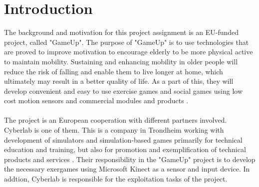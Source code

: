 \chapter{Introduction}
The background and motivation for this project assignment is an EU-funded project, called "GameUp". The purpose of "GameUp" is to use technologies that are proved to improve motivation to encourage elderly to be more physical active to maintain mobility. Sustaining and enhancing mobility in older people will reduce the risk of falling and enable them to live longer at home, which ultimately may result in a better quality of life. As a part of this, they will develop convenient and easy to use exercise games and social games using low cost motion sensors and commercial modules and products \cite{gameup}.\\ \\ The project is an European cooperation with different partners involved. Cyberlab is one of them. This is a company in Trondheim working with development of simulators and simulation-based games primarily for technical education and training, but also for promotion and exemplification of technical products and services \cite{cyberlab}. Their responsibility in the "GameUp" project is to develop the necessary exergames using Microsoft Kinect as a sensor and input device. In addtion, Cyberlab is responsible for the exploitation tasks of the project.  \\ \\

